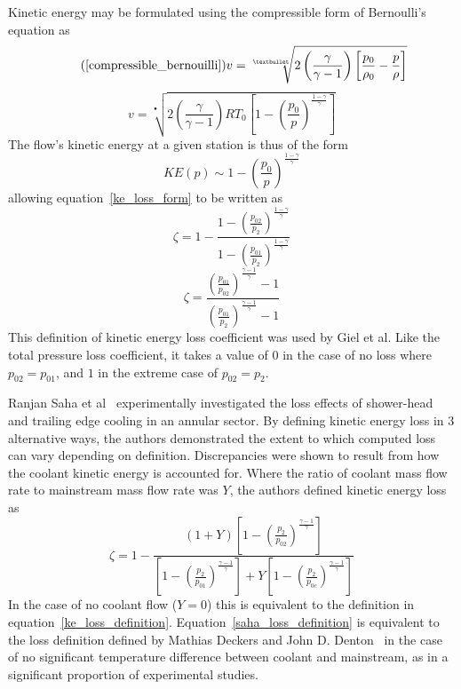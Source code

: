 \documentclass[a4paper, 11pt, oneside]{report}
\begin{document}
Kinetic energy may be formulated using the compressible form of Bernoulli's equation as
\begin{equation}\tag{\ref{compressible_bernouilli}}
v = 
\sqrt[•]{ 
2 \left( \frac{\gamma}{\gamma - 1} \right) \left[ \frac{p_0}{\rho_0} - \frac{p}{\rho} \right] 
}
\end{equation}
\begin{equation}
v =
\sqrt[•]{ 
	2 \left( \frac{\gamma}{\gamma - 1} \right)
	R T_0
	\left[
		1 - \left(
			\frac{p_0}{p}
		\right)
		^\frac{1-\gamma}{\gamma}
	\right] 
}
\end{equation}
The flow's kinetic energy at a given station is thus of the form
\begin{equation}
KE(p) \sim
1 - \left(
	\frac{p_0}{p}
\right)
^\frac{1-\gamma}{\gamma}
\end{equation}
allowing equation~\ref{ke_loss_form} to be written as
\begin{equation}
\zeta = 
1 - 
\frac{
	1 -
	\left(
		\frac{p_{02}}{p_2}
	\right)
	^\frac{1-\gamma}{\gamma}
}{
	1 -
	\left(
		\frac{p_{01}}{p_2}
	\right)
	^\frac{1-\gamma}{\gamma}
}
\end{equation}
\begin{equation}\label{ke_loss_definition}
\zeta = 
\frac{ 
	\left(
		\frac{p_{01}}{p_{02}}
	\right)
	^\frac{\gamma-1}{ \gamma } - 1 
}{
	\left(
	\frac{p_{01}}{p_{2}}
	\right)
	^\frac{\gamma-1}{ \gamma } - 1 
}
\end{equation}
This definition of kinetic energy loss coefficient was used by Giel et al. Like the total pressure loss coefficient, it takes a value of $0$ in the case of no loss where $p_{02} = p_{01}$, and $1$ in the extreme case of $p_{02} = p_2$.

Ranjan Saha et al~\cite{saha_loss} experimentally investigated the loss effects of shower-head and trailing edge cooling in an annular sector. By defining kinetic energy loss in 3 alternative ways, the authors demonstrated the extent to which computed loss can vary depending on definition. Discrepancies were shown to result from how the coolant kinetic energy is accounted for. Where the ratio of coolant mass flow rate to mainstream mass flow rate was $Y$, the authors defined kinetic energy loss as
\begin{equation}\label{saha_loss_definition}
\zeta = 
1 -
\frac{ 
	\left( 1 + Y \right) 
	\left[
		1 -
		\left(
			\frac{p_2}{p_{02}}
		\right)
		^\frac{\gamma-1}{\gamma}
	\right]
}{
	\left[
		1 -
		\left(
			\frac{p_2}{p_{01}}
		\right)
		^\frac{\gamma-1}{\gamma}
	\right]
	+Y
	\left[
		1 -
		\left(
			\frac{p_2}{p_{0c}}
		\right)
		^\frac{\gamma-1}{\gamma}
	\right]
}
\end{equation}
In the case of no coolant flow ($Y=0$) this is equivalent to the definition in equation~\ref{ke_loss_definition}. Equation~\ref{saha_loss_definition} is equivalent to the loss definition defined by Mathias Deckers and John D. Denton~\cite{deckers_loss} in the case of no significant temperature difference between coolant and mainstream, as in a significant proportion of experimental studies.
\end{document}
